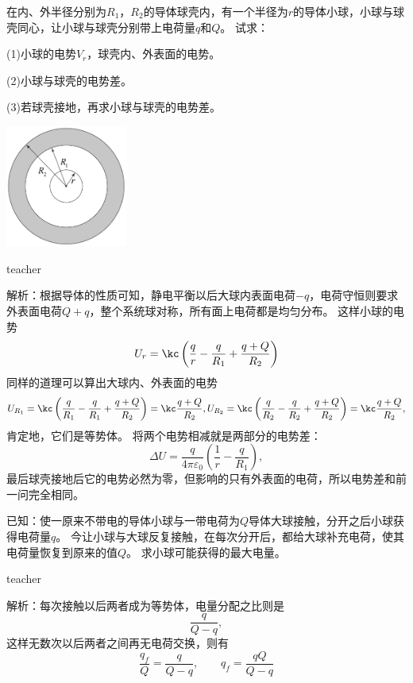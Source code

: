 \begin{example}

在内、外半径分别为$R_1$，$R_2$的导体球壳内，有一个半径为$r$的导体小球，小球与球壳同心，让小球与球壳分别带上电荷量$q$和$Q$。
试求：

(1)小球的电势$V_r$，球壳内、外表面的电势。

(2)小球与球壳的电势差。

(3)若球壳接地，再求小球与球壳的电势差。
\begin{flushright}
\includegraphics[width = 0.3\textwidth]{images/elec-problem-13.pdf} 
\end{flushright}
\begin{taggedblock}{teacher}

解析：根据导体的性质可知，静电平衡以后大球内表面电荷$-q$，电荷守恒则要求外表面电荷$Q+q$，整个系统球对称，所有面上电荷都是均匀分布。
这样小球的电势
\[
U_r = \kc \left(\frac{q}{r}-\frac{q}{R_1}+\frac{q+Q}{R_2}\right)
\]
同样的道理可以算出大球内、外表面的电势
\[
U_{R_1} = \kc \left(\frac{q}{R_1}-\frac{q}{R_1}+\frac{q+Q}{R_2}\right) = \kc\frac{q+Q}{R_2},U_{R_2} = \kc \left(\frac{q}{R_2}-\frac{q}{R_2}+\frac{q+Q}{R_2}\right) = \kc\frac{q+Q}{R_2},
\]
肯定地，它们是等势体。
将两个电势相减就是两部分的电势差：
\[
\Delta U = \frac{q}{4\pi\varepsilon_0}\left(\frac{1}{r}-\frac{q}{R_1}\right),
\]
最后球壳接地后它的电势必然为零，但影响的只有外表面的电荷，所以电势差和前一问完全相同。
\end{taggedblock}
\end{example}




\begin{example}
已知：使一原来不带电的导体小球与一带电荷为$Q$导体大球接触，分开之后小球获得电荷量$q$。
今让小球与大球反复接触，在每次分开后，都给大球补充电荷，使其电荷量恢复到原来的值$Q$。
求小球可能获得的最大电量。

\begin{taggedblock}{teacher}

解析：每次接触以后两者成为等势体，电量分配之比则是
\[
\frac{q}{Q-q},
\]
这样无数次以后两者之间再无电荷交换，则有
\[
\frac{q_f}{Q} = \frac{q}{Q-q},\qquad q_f = \frac{qQ}{Q-q}
\]
\end{taggedblock}
\end{example}








